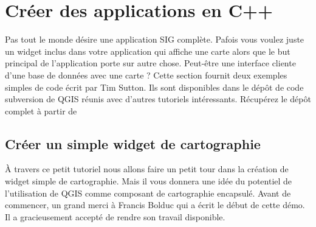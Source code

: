 \section{Créer des applications en C++}

Pas tout le monde désire une application SIG complète. Pafois vous voulez juste
un widget inclus dans votre application qui affiche une carte alors que le but 
principal de l'application porte sur autre chose. Peut-être une interface 
cliente d'une base de données avec une carte ? Cette section fournit deux 
exemples simples de code écrit par Tim Sutton. Ils sont disponibles dans le dépôt
 de code subversion de QGIS réunis avec d'autres tutoriels intéressants. 
 Récupérez le dépôt complet à partir de 

\subsection{Créer un simple widget de cartographie}\label{subsec:simple_widget}

À travers ce petit tutoriel nous allons faire un petit tour dans la création de
widget simple de cartographie.
Mais il vous donnera une idée du potentiel de l'utilisation de QGIS comme 
composant de cartographie encapsulé. Avant de commencer, un grand merci à 
Francis Bolduc qui a écrit le début de cette démo. Il a gracieusement accepté de
rendre son travail disponible.

